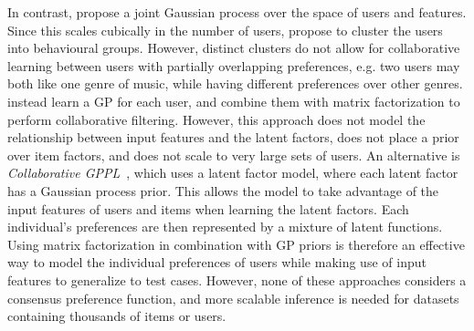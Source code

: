 In contrast, \citet{guo2010gaussian} propose a joint Gaussian process over the
space of users and features. Since this scales cubically
in the number of users, \citet{abbasnejad2013learning} 
propose to cluster the users into behavioural groups.
However, distinct clusters do not
allow for collaborative learning between users with partially overlapping preferences, e.g. two users may both like one genre of music, 
while having different preferences over other genres. 
\citet{khan2014scalable} instead learn a GP for each user,
and combine them with matrix factorization to perform collaborative filtering.
However, this approach does not model the relationship between
 input features and the latent factors, does not place a prior over item factors,
 and does not scale to very large sets of users.
An alternative is \emph{Collaborative GPPL}~\citep{houlsby2012collaborative},
which uses a latent factor model, where each latent factor has a Gaussian process prior. 
This allows the model to take advantage of the input features of
users and items when learning the latent factors. 
Each individual's preferences are then represented 
by a mixture of latent functions.
Using matrix factorization in combination with GP priors is therefore an effective
way to model the individual preferences of users while
making use of input features to generalize to test cases. However,
none of these approaches considers a consensus preference function, and
more scalable inference is needed for datasets containing thousands of items or users.

